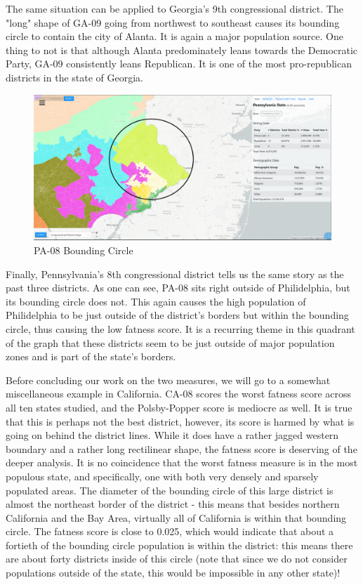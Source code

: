 \documentclass[letterpaper]{article}
\begin{document}
The same situation can be applied to Georgia's 9th congressional district. The "long" shape of GA-09 going from northwest to southeast causes its bounding circle to contain the city of Alanta. It is again a major population source. One thing to not is that although Alanta predominately leans towards the Democratic Party, GA-09 consistently leans Republican. It is one of the most pro-republican districts in the state of Georgia.

\begin{figure}[H]
	\includegraphics[width=\linewidth]{./figures/PA-08-BoundingCircle.png}
	\caption{PA-08 Bounding Circle}
	\label{fig:pa08boundingCircle}
\end{figure}

Finally, Pennsylvania's 8th congressional district tells us the same story as the past three districts. As one can see, PA-08 sits right outside of Philidelphia, but its bounding circle does not. This again causes the high population of Philidelphia to be just outside of the district's borders but within the bounding circle, thus causing the low fatness score. It is a recurring theme in this quadrant of the graph that these districts seem to be just outside of major population zones and is part of the state's borders.



Before concluding our work on the two measures, we will go to a somewhat miscellaneous example in California. CA-08 scores the worst fatness score across all ten states studied, and the Polsby-Popper score is mediocre as well. It is true that this is perhaps not the best district, however, its score is harmed by what is going on behind the district lines. While it does have a rather jagged western boundary and a rather long rectilinear shape, the fatness score is deserving of the deeper analysis. It is no coincidence that the worst fatness measure is in the most populous state, and specifically, one with both very densely and sparsely populated areas. The diameter of the bounding circle of this large district is almost the northeast border of the district - this means that besides northern California and the Bay Area, virtually all of California is within that bounding circle. The fatness score is close to 0.025, which would indicate that about a fortieth of the bounding circle population is within the district: this means there are about forty districts inside of this circle (note that since we do not consider populations outside of the state, this would be impossible in any other state)! 
\end{document}
